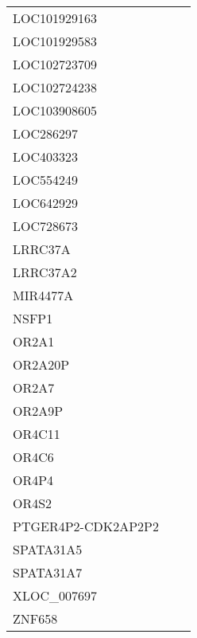 \begin{tabular}{lcc}
LOC101929163       &    &         \\
LOC101929583       &    &         \\
LOC102723709       &    &         \\
LOC102724238       &    &         \\
LOC103908605       &    &         \\
LOC286297          &    &         \\
LOC403323          &    &         \\
LOC554249          &    &         \\
LOC642929          &    &         \\
LOC728673          &    &         \\
LRRC37A            &    &         \\
LRRC37A2           &    &         \\
MIR4477A           &    &         \\
NSFP1              &    &         \\
OR2A1              &    &         \\
OR2A20P            &    &         \\
OR2A7              &    &         \\
OR2A9P             &    &         \\
OR4C11             &    &         \\
OR4C6              &    &         \\
OR4P4              &    &         \\
OR4S2              &    &         \\
PTGER4P2-CDK2AP2P2 &    &         \\
SPATA31A5          &    &         \\
SPATA31A7          &    &         \\
XLOC\_007697        &    &         \\
ZNF658             &    &         \\
\bottomrule
\end{tabular}
